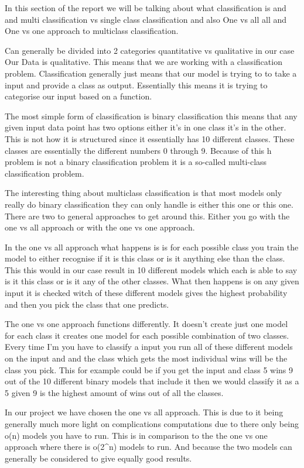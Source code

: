 In this section of the report we will be talking about what classification is and and multi classification vs single class classification and also One vs all all and One vs one approach to multiclass classification.


Can generally be divided into 2 categories quantitative vs qualitative in our case Our Data is qualitative. This means that we are working with a classification problem.
Classification generally just means that our model is trying to to take a input and provide a class as output. Essentially this means it is trying to categorise our input based on a function.

The most simple form of classification is binary classification this means that any given input data point has two options either it's in one class it's in the other. This is not how it is structured since it essentially has 10 different classes. These classes are essentially the different numbers 0 through 9. Because of this h problem is not a binary classification problem it is a so-called multi-class classification problem.

The interesting thing about multiclass classification is that most models only really do binary classification they can only handle is either this one or this one. There are two to general approaches to get around this. Either you go with the one vs all approach or with the one vs one approach.

In the one vs all approach what happens is is for each possible class you train the model to either recognise if it is this class or is it anything else than the class. This this would in our case result in 10 different models which each is able to say is it this class or is it any of the other classes. What then happens is on any given input it is checked witch of these different models gives the highest probability and then you pick the class that one predicts.

The one vs one approach functions differently. It doesn't create just one model for each class it creates one model for each possible combination of two classes. Every time I'm you have to classify a input you run all of these different models on the input and and the class which gets the most individual wins will be the class you pick. This for example could be if you get the input and class 5 wins 9 out of the 10 different binary models that include it then we would classify it as a 5 given 9 is the highest amount of wins out of all the classes.\cite{james-statistical-learning}

In our project we have chosen the one vs all approach. This is due to it being generally much more light on complications computations due to there only being o(n) models you have to run. This is in comparison to the the one vs one approach where there is o(2^n) models to run. And because the two models can generally be considered to give equally good results. \cite{rifkin-defense-one-vs-all}



